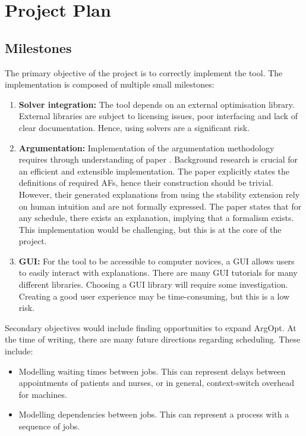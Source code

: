 \chapter{Project Plan}

\section{Milestones}

The primary objective of the project is to correctly implement the tool. The implementation is composed of multiple small milestones:

\begin{enumerate}
	\item\textbf{Solver integration:} The tool depends on an external optimisation library. External libraries are subject to licensing issues, poor interfacing and lack of clear documentation. Hence, using solvers are a significant risk.
	\item\textbf{Argumentation:} Implementation of the argumentation methodology requires through understanding of paper \cite{aes}. Background research is crucial for an efficient and extensible implementation. The paper explicitly states the definitions of required AFs, hence their construction should be trivial. However, their generated explanations from using the stability extension rely on human intuition and are not formally expressed. The paper states that for any schedule, there exists an explanation, implying that a formalism exists. This implementation would be challenging, but this is at the core of the project.
	\item\textbf{GUI:} For the tool to be accessible to computer novices, a GUI allows users to easily interact with explanations. There are many GUI tutorials for many different libraries. Choosing a GUI library will require some investigation. Creating a good user experience may be time-consuming, but this is a low risk.
\end{enumerate}

Secondary objectives would include finding opportunities to expand ArgOpt. At the time of writing, there are many future directions regarding scheduling. These include:
\begin{itemize}
	\item Modelling waiting times between jobs. This can represent delays between appointments of patients and nurses, or in general, context-switch overhead for machines.
	\item Modelling dependencies between jobs. This can represent a process with a sequence of jobs.
\end{itemize}
